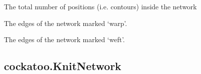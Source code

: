 \documentclass[letterpaper,10pt,english]{sphinxmanual}
\begin{document}
\begin{fulllineitems}
\begin{fulllineitems}
\end{fulllineitems}


\begin{fulllineitems}
\label{\detokenize{cockatoo:cockatoo.KnitNetworkBase.total_positions}}
The total number of positions (i.e. contours) inside the network

\end{fulllineitems}


\begin{fulllineitems}
\label{\detokenize{cockatoo:cockatoo.KnitNetworkBase.warp_edges}}
The edges of the network marked ‘warp’.

\end{fulllineitems}


\begin{fulllineitems}
\label{\detokenize{cockatoo:cockatoo.KnitNetworkBase.weft_edges}}
The edges of the network marked ‘weft’.

\end{fulllineitems}


\end{fulllineitems}



\subsection{cockatoo.KnitNetwork}
\label{\detokenize{cockatoo:cockatoo-knitnetwork}}
\end{document}
